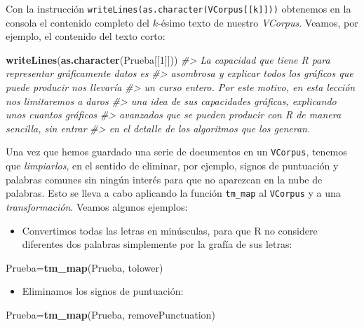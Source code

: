 \documentclass[
]{book}
\newenvironment{Shaded}{\begin{snugshade}}{\end{snugshade}}
\newcommand{\CommentTok}[1]{\textcolor[rgb]{0.56,0.35,0.01}{\textit{#1}}}
\newcommand{\DecValTok}[1]{\textcolor[rgb]{0.00,0.00,0.81}{#1}}
\newcommand{\KeywordTok}[1]{\textcolor[rgb]{0.13,0.29,0.53}{\textbf{#1}}}
\newcommand{\NormalTok}[1]{#1}
\providecommand{\tightlist}{%
  \setlength{\itemsep}{0pt}\setlength{\parskip}{0pt}}
\theoremstyle{definition}
\theoremstyle{definition}
\theoremstyle{definition}
\theoremstyle{remark}
\begin{document}
Con la instrucción \texttt{writeLines(as.character(VCorpus{[}{[}k{]}{]}))} obtenemos en la consola el contenido completo del \(k\)-ésimo texto de nuestro \emph{VCorpus}. Veamos, por ejemplo, el contenido del texto corto:

\begin{Shaded}
\begin{Highlighting}[]
\KeywordTok{writeLines}\NormalTok{(}\KeywordTok{as.character}\NormalTok{(Prueba[[}\DecValTok{1}\NormalTok{]]))}
\CommentTok{\#\textgreater{} La capacidad que tiene R para representar gráficamente datos es }
\CommentTok{\#\textgreater{} asombrosa y explicar todos los gráficos que puede producir  nos llevaría }
\CommentTok{\#\textgreater{} un curso entero. Por este motivo,  en esta lección nos limitaremos a daros }
\CommentTok{\#\textgreater{} una idea de sus capacidades gráficas, explicando unos cuantos gráficos }
\CommentTok{\#\textgreater{} avanzados que se pueden  producir con R de manera sencilla, sin  entrar }
\CommentTok{\#\textgreater{} en el detalle de los algoritmos que los  generan.}
\end{Highlighting}
\end{Shaded}

Una vez que hemos guardado una serie de documentos en un \texttt{VCorpus}, tenemos que \emph{limpiarlos}, en el sentido de eliminar, por ejemplo, signos de puntuación y palabras comunes sin ningún interés para que no aparezcan en la nube de palabras. Esto se lleva a cabo aplicando la función \texttt{tm\_map} al \texttt{VCorpus} y a una \emph{transformación}. Veamos algunos ejemplos:

\begin{itemize}
\tightlist
\item
  Convertimos todas las letras en minúsculas, para que R no considere diferentes dos palabras simplemente por la grafía de sus letras:
\end{itemize}

\begin{Shaded}
\begin{Highlighting}[]
\NormalTok{Prueba=}\KeywordTok{tm\_map}\NormalTok{(Prueba, tolower)}
\end{Highlighting}
\end{Shaded}

\begin{itemize}
\tightlist
\item
  Eliminamos los signos de puntuación:
\end{itemize}

\begin{Shaded}
\begin{Highlighting}[]
\NormalTok{Prueba=}\KeywordTok{tm\_map}\NormalTok{(Prueba, removePunctuation)}
\end{Highlighting}
\end{Shaded}
\end{document}
